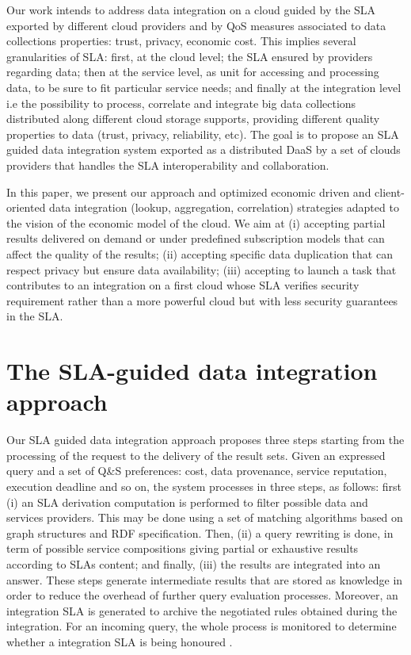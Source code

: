 \documentclass[10pt, conference, compsocconf]{IEEEtran}
\begin{document}
Our work intends to address data integration on a  cloud guided by the SLA exported by different cloud providers and by QoS measures associated to data collections properties: trust, privacy, economic cost. 
This implies several granularities of SLA: first, at the cloud level; the SLA ensured by providers regarding data; then at the service level, as unit for accessing and processing data, to be sure to fit particular service needs; and finally at the integration level i.e the possibility to process, correlate and integrate big data collections distributed along different cloud storage supports, providing different quality properties to data (trust, privacy, reliability, etc).
The goal is to propose an SLA guided data integration system exported as a distributed DaaS by a set of clouds providers that handles the SLA interoperability and collaboration. 


In this paper, we present our approach and optimized economic driven and client-oriented data integration (lookup, aggregation, correlation) strategies adapted to the vision of the economic model of the cloud.
We aim at (i) accepting partial results delivered on demand or under predefined subscription models that can affect the quality of the results; (ii) accepting specific data duplication that can respect privacy but ensure data availability; (iii) accepting to launch a task that contributes to an integration on a first cloud whose SLA verifies security requirement rather than a more powerful cloud but with less security guarantees in the SLA. 

\section{The SLA-guided  data integration approach}
Our SLA guided data  integration approach proposes three steps starting from the processing of the request to the delivery of the result sets.
Given an expressed query and a set of Q\&S preferences: cost, data provenance, service reputation, execution deadline and so on, the system processes in three steps, as follows: first (i) an SLA derivation computation is performed to filter possible data and services providers.
This may be done using a set of matching algorithms based on  graph structures and RDF specification.
Then, (ii) a query rewriting is done, in term of possible service compositions giving partial or exhaustive  results according to SLAs content; and finally, (iii) the results are integrated into an answer. 
These steps generate intermediate results that are stored as knowledge in order to reduce the overhead of further query evaluation processes. Moreover, an integration SLA is generated to archive the negotiated rules obtained during  the integration. For an incoming query, the whole process is monitored to determine whether a integration SLA is being honoured .
\end{document}
